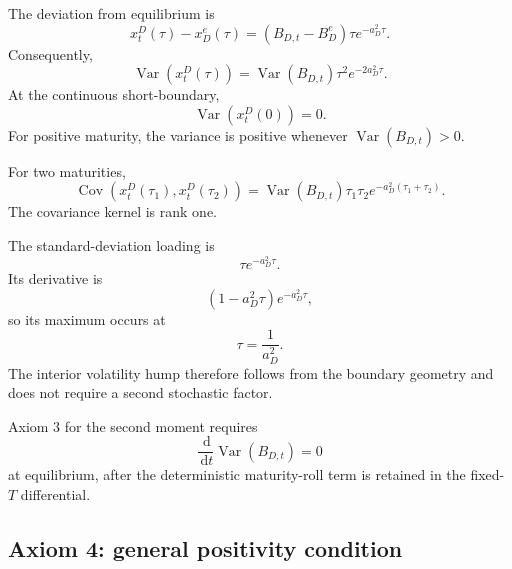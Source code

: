 \documentclass[12pt]{article}
\numberwithin{equation}{subsection}
\newcommand{\Var}{\operatorname{Var}}
\newcommand{\Cov}{\operatorname{Cov}}
\newcommand{\dd}{\,\mathrm{d}}
\begin{document}
The deviation from equilibrium is
\begin{equation}
x^D_t(\tau)-x_D^e(\tau)
=
(B_{D,t}-B_D^e)\tau e^{-a_D^2\tau}.
\end{equation}
Consequently,
\begin{equation}
\Var\!\left(x^D_t(\tau)\right)
=
\Var(B_{D,t})\tau^2e^{-2a_D^2\tau}.
\end{equation}
At the continuous short-boundary,
\begin{equation}
\Var\!\left(x^D_t(0)\right)=0.
\end{equation}
For positive maturity, the variance is positive whenever $\Var(B_{D,t})>0$.

For two maturities,
\begin{equation}
\Cov\!\left(x^D_t(\tau_1),x^D_t(\tau_2)\right)
=
\Var(B_{D,t})\tau_1\tau_2e^{-a_D^2(\tau_1+\tau_2)}.
\end{equation}
The covariance kernel is rank one.

The standard-deviation loading is
\begin{equation}
\tau e^{-a_D^2\tau}.
\end{equation}
Its derivative is
\begin{equation}
(1-a_D^2\tau)e^{-a_D^2\tau},
\end{equation}
so its maximum occurs at
\begin{equation}
\tau=\frac{1}{a_D^2}.
\end{equation}
The interior volatility hump therefore follows from the boundary geometry and does not require a second stochastic factor.

Axiom 3 for the second moment requires
\begin{equation}
\frac{\dd}{\dd t}\Var(B_{D,t})=0
\end{equation}
at equilibrium, after the deterministic maturity-roll term is retained in the fixed-$T$ differential.

\subsection{Axiom 4: general positivity condition}
\end{document}
